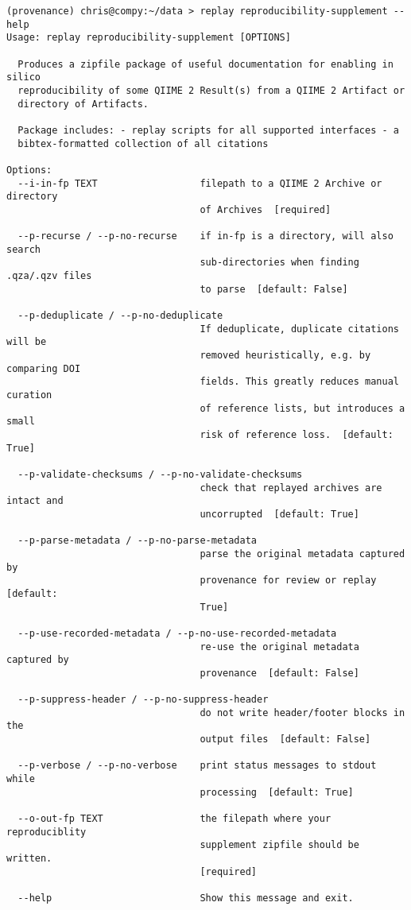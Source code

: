 \begin{footnotesize}
\begin{verbatim}
(provenance) chris@compy:~/data > replay reproducibility-supplement --help
Usage: replay reproducibility-supplement [OPTIONS]

  Produces a zipfile package of useful documentation for enabling in silico
  reproducibility of some QIIME 2 Result(s) from a QIIME 2 Artifact or
  directory of Artifacts.

  Package includes: - replay scripts for all supported interfaces - a
  bibtex-formatted collection of all citations

Options:
  --i-in-fp TEXT                  filepath to a QIIME 2 Archive or directory
                                  of Archives  [required]

  --p-recurse / --p-no-recurse    if in-fp is a directory, will also search
                                  sub-directories when finding .qza/.qzv files
                                  to parse  [default: False]

  --p-deduplicate / --p-no-deduplicate
                                  If deduplicate, duplicate citations will be
                                  removed heuristically, e.g. by comparing DOI
                                  fields. This greatly reduces manual curation
                                  of reference lists, but introduces a small
                                  risk of reference loss.  [default: True]

  --p-validate-checksums / --p-no-validate-checksums
                                  check that replayed archives are intact and
                                  uncorrupted  [default: True]

  --p-parse-metadata / --p-no-parse-metadata
                                  parse the original metadata captured by
                                  provenance for review or replay  [default:
                                  True]

  --p-use-recorded-metadata / --p-no-use-recorded-metadata
                                  re-use the original metadata captured by
                                  provenance  [default: False]

  --p-suppress-header / --p-no-suppress-header
                                  do not write header/footer blocks in the
                                  output files  [default: False]

  --p-verbose / --p-no-verbose    print status messages to stdout while
                                  processing  [default: True]

  --o-out-fp TEXT                 the filepath where your reproduciblity
                                  supplement zipfile should be written.
                                  [required]

  --help                          Show this message and exit.
\end{verbatim}
\end{footnotesize}